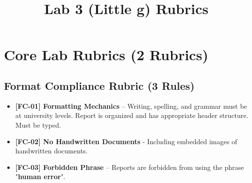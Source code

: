 \documentclass{article}
\begin{document}
\pagestyle{empty}

\title{Lab 3 (Little g) Rubrics}

\section*{Core Lab Rubrics (2 Rubrics)}

\subsection*{Format Compliance Rubric (3 Rules)}
\begin{itemize}
\item \textbf{ [FC-01] Formatting Mechanics } – Writing, spelling, and grammar must be at university levels. Report is organized and has appropriate header structure. Must be typed.
\item \textbf{ [FC-02] No Handwritten Documents } - Including embedded images of handwritten documents.
\item \textbf{ [FC-03] Forbidden Phrase } – Reports are forbidden from using the phrase "\textbf{human error}". 
\end{itemize}
\end{document}

